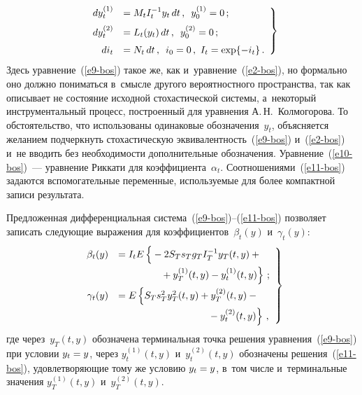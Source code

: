 \begin{multicols}{2}
     \noindent
\begin{equation}
\left.
\begin{array}{rl}
dy_t^{(1)}&= M_t I_t^{-1} y_t \,dt\,,\enskip
y_0^{(1)}=0\,;\\[6pt]
 dy_t^{(2)}&=L_t(y_t)\,dt\,,\enskip y_0^{(2)}=0\,;\\[6pt]
 di_t&=N_t\,dt\,,\enskip
i_0=0\,,\ I_t=\exp \{-i_t\}\,.
\end{array}
\right\}
\label{e11-bos}
\end{equation}
     Здесь уравнение~(\ref{e9-bos}) такое же, как
      и~уравнение~(\ref{e2-bos}), но формально оно должно пониматься 
в~смысле другого вероятностного пространства, так как описывает не 
состояние исходной стохастической сис\-те\-мы, а~некоторый 
инструментальный процесс, построенный для уравнения 
А.\,Н.~Колмогорова. То обстоятельство, что использованы одинаковые 
обозначения~$y_t$, объясняется желанием подчеркнуть стохастическую 
эквивалентность~(\ref{e9-bos}) и~(\ref{e2-bos}) и~не вводить без 
необходимости дополнительные обозначения. Уравнение~(\ref{e10-bos})~--- уравнение 
Риккати для коэффициента~$\alpha_t$. Соотношениями~(\ref{e11-bos}) 
задаются вспомогательные переменные, используемые для более компактной 
записи результата.
     
     Предложенная дифференциальная  
система~(\ref{e9-bos})--(\ref{e11-bos}) позволяет записать следующие 
выражения для коэффициентов~$\beta_t(y)$ и~$\gamma_t(y)$:
     \begin{equation}
     \left.
     \begin{array}{rl}
     \beta_t(y)&=I_t E\left\{
     \vphantom{y_t^{(1)}}
      -2S_T s_T g_T I_T^{-1} y_T(t,y)+{}\right.\\[6pt]
     &\left.\hspace*{15mm}{}+y_T^{(1)}(t,y)-
y_t^{(1)}(t,y)\right\}\,;\\[6pt]
     \gamma_t(y)&=E\left\{ S_T s_T^2 y_T^2(t,y)+y_T^{(2)}(t,y)-{}\right.\\[6pt]
&\left.\hspace*{32mm}{}-y_t^{(2)}(t,y)
     \vphantom{y_t^{(1)}}
     \right\}\,,
     \end{array}
     \right\}
     \label{e12-bos}
     \end{equation}
где через~$y_T(t,y)$ обозначена терминальная точка решения 
уравнения~(\ref{e9-bos}) при условии $y_t\hm=y$, через $y_t^{(1)}(t,y)$ 
и~$y_t^{(2)}(t,y)$ обозначены решения~(\ref{e11-bos}), удовле\-тво\-ря\-ющие тому 
же условию $y_t\hm=y$, в~том чис\-ле и~терминальные значения 
$y_T^{(1)}(t,y)$ и~$y_T^{(2)}(t,y)$. 
     

\end{multicols}
